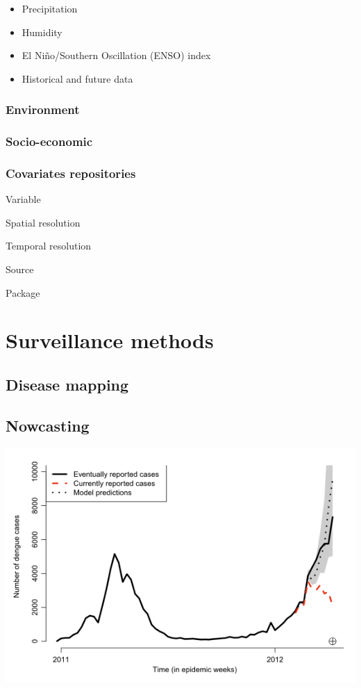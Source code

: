 \documentclass[
  letterpaper,
  DIV=11,
  numbers=noendperiod]{scrreprt}
\providecommand{\tightlist}{%
  \setlength{\itemsep}{0pt}\setlength{\parskip}{0pt}}\usepackage{longtable,booktabs,array}
\begin{document}
\begin{itemize}
\tightlist
\item
  Precipitation
\item
  Humidity
\item
  El Niño/Southern Oscillation (ENSO) index
\item
  Historical and future data
\end{itemize}

\hypertarget{environment}{%
\section{Environment}\label{environment}}

\hypertarget{socio-economic}{%
\section{Socio-economic}\label{socio-economic}}

\hypertarget{covariates-repositories}{%
\section{Covariates repositories}\label{covariates-repositories}}

Variable

Spatial resolution

Temporal resolution

Source

Package

\part{Surveillance methods}

\hypertarget{disease-mapping}{%
\chapter{Disease mapping}\label{disease-mapping}}

\hypertarget{nowcasting}{%
\chapter{Nowcasting}\label{nowcasting}}

\includegraphics[width=6.25in,height=\textheight]{img/nowcastingleobastos.png}
\end{document}
